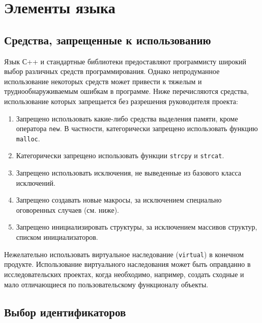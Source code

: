 \vspace{1cm}
\section{Элементы языка}
\subsection{Средства, запрещенные к использованию}

Язык С++ и стандартные библиотеки предоставляют программисту широкий выбор различных средств программирования. Однако непродуманное использование некоторых средств может привести к тяжелым и труднообнаруживаемым ошибкам в программе. Ниже перечисляются средства, использование которых запрещается без разрешения руководителя проекта:

\begin{enumerate}
	\item Запрещено использовать какие-либо средства выделения памяти, кроме оператора \lstinline|new|. В частности, категорически запрещено использовать функцию \lstinline|malloc|.
	\item Категорически запрещено использовать функции \lstinline|strcpy| и \lstinline|strcat|.
	\item Запрещено использовать исключения, не выведенные из базового класса исключений.%
	\item Запрещено создавать новые макросы, за исключением специально оговоренных случаев (см. ниже).
	\item Запрещено инициализировать структуры, за исключением массивов структур, списком инициализаторов.%
\end{enumerate}

Нежелательно использовать виртуальное наследование (\lstinline|virtual|) в конечном продукте. Использование виртуального наследования может быть оправданно в исследовательских проектах, когда необходимо, например, создать сходные и мало отличающиеся по пользовательскому функционалу объекты.

\newpage
\subsection{Выбор идентификаторов}

